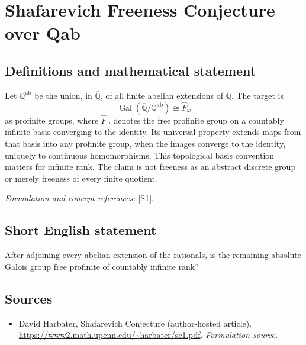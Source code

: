 \documentclass[11pt]{article}
\begin{document}
\section*{\texorpdfstring{Shafarevich Freeness Conjecture over Qab}{Shafarevich Freeness Conjecture over Qab}}\label{230}
\subsection{Definitions and mathematical statement}
Let ${\mathbb{Q}}^{\mathrm{ab}}$ be the union, in $\overline{{\mathbb{Q}}}$, of all finite abelian extensions of ${\mathbb{Q}}$. The target is
\[
 \operatorname{Gal}(\overline{{\mathbb{Q}}}/{\mathbb{Q}}^{\mathrm{ab}})\cong\widehat F_\omega
\]
as profinite groups, where $\widehat F_\omega$ denotes the free profinite group on a countably infinite basis converging to the identity. Its universal property extends maps from that basis into any profinite group, when the images converge to the identity, uniquely to continuous homomorphisms. This topological basis convention matters for infinite rank. The claim is not freeness as an abstract discrete group or merely freeness of every finite quotient.
\par\smallskip\textit{Formulation and concept references:} \href{https://www2.math.upenn.edu/~harbater/sc1.pdf}{[S1]}.

\subsection{Short English statement}
After adjoining every abelian extension of the rationals, is the remaining absolute Galois group free profinite of countably infinite rank?
\subsection{Sources}
\begin{itemize}
\item[S1]David Harbater, Shafarevich Conjecture (author-hosted article).
\url{https://www2.math.upenn.edu/~harbater/sc1.pdf}.
\textit{Formulation source.}
\end{itemize}
\end{document}
